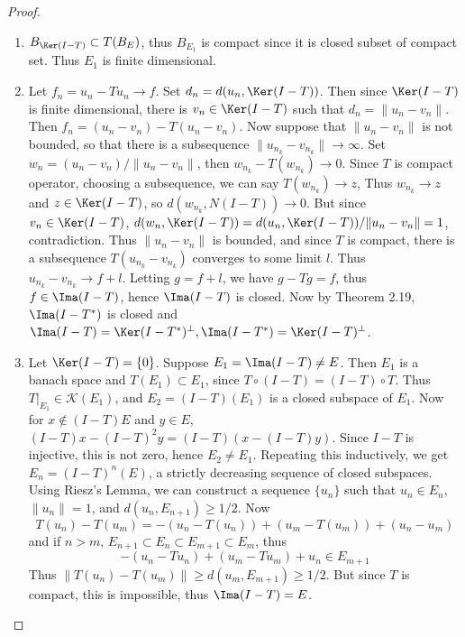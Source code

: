 \begin{proof}
~\begin{enumerate}
    \item $B_{\Ker(I-T)}\subset T(B_E)$, thus $B_{E_1}$ is compact since it is closed subset of compact set. Thus $E_1$ is finite dimensional.
    \item Let $f_n=u_n-T u_n\rightarrow f$. Set $d_n=d(u_n,\Ker(I-T))$. Then since $\Ker(I-T)$ is finite dimensional, there is $v_n\in \Ker(I-T)$ such that $d_n=\|u_n-v_n\|$. Then $f_n=(u_n-v_n)-T(u_n-v_n)$. Now suppose that $\|u_n-v_n\|$ is not bounded, so that there is a subsequence $\|u_{n_k}-v_{n_k}\|\rightarrow \infty$. Set $w_n=(u_n-v_n)/\|u_n-v_n\|$, then $w_{n_k}-T(w_{n_k})\rightarrow 0$. Since $T$ is compact operator, choosing a subsequence, we can say $T(w_{n_k})\rightarrow z$, Thus $w_{n_k}\rightarrow z$ and $z\in \Ker (I-T)$, so $d(w_{n_k},N(I-T))\rightarrow 0$. But since $v_n\in \Ker(I-T)$, $d(w_n,\Ker(I-T))=d(u_n,\Ker(I-T))/\|u_n-v_n\|=1$, contradiction. Thus $\|u_n-v_n\|$ is bounded, and since $T$ is compact, there is a subsequence $T(u_{n_k}-v_{n_k})$ converges to some limit $l$. Thus $u_{n_k}-v_{n_k}\rightarrow f+l$. Letting $g=f+l$, we have $g-Tg=f$, thus $f\in \Ima(I-T)$, hence $\Ima(I-T)$ is closed. Now by Theorem 2.19, $\Ima(I-T^*)$ is closed and $\Ima(I-T)=\Ker(I-T^*)^\perp, \Ima(I-T^*)=\Ker(I-T)^\perp$.
    \item Let $\Ker(I-T)=\{0\}$. Suppose $E_1=\Ima(I-T)\neq E$. Then $E_1$ is a banach space and $T(E_1)\subset E_1$, since $T\circ (I-T)=(I-T)\circ T$. Thus $T|_{E_1}\in \mathcal{K}(E_1)$, and $E_2=(I-T)(E_1)$ is a closed subspace of $E_1$. Now for $x\notin (I-T)E$ and $y\in E$, $(I-T)x-(I-T)^2 y = (I-T)(x-(I-T)y)$. Since $I-T$ is injective, this is not zero, hence $E_2\neq E_1$. Repeating this inductively, we get $E_n=(I-T)^n(E)$, a strictly decreasing sequence of closed subspaces. Using Riesz's Lemma, we can construct a sequence $\{u_n\}$ such that $u_n\in E_n$, $\|u_n\|=1$, and $d(u_n,E_{n+1})\geq 1/2$. Now
    \begin{equation}
        T(u_n)-T(u_m)=-(u_n-T(u_n))+(u_m-T(u_m))+(u_n-u_m)
    \end{equation}
    and if $n>m$, $E_{n+1}\subset E_n\subset E_{m+1}\subset E_m$, thus
    \begin{equation}
        -(u_n - Tu_n)+(u_m - Tu_m)+u_n\in E_{m+1}
    \end{equation}
    Thus $\|T(u_n)-T(u_m)\|\geq d(u_m,E_{m+1})\geq 1/2$. But since $T$ is compact, this is impossible, thus $\Ima(I-T)=E$.
    

\end{enumerate}
\end{proof}
